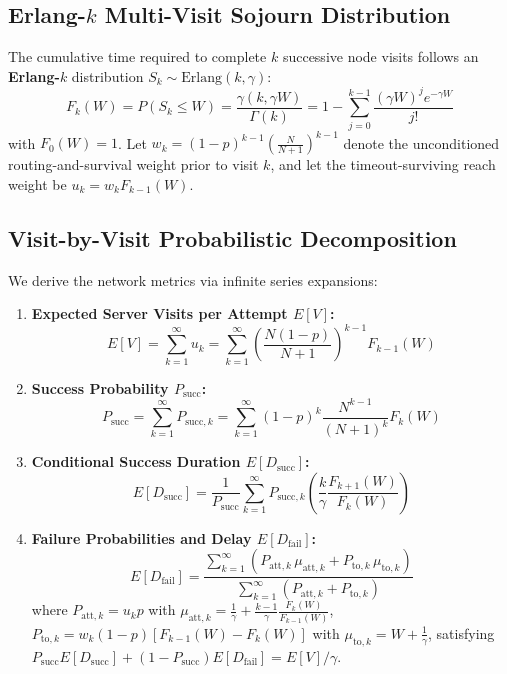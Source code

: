 \documentclass[journal,compsoc]{IEEEtran}
\begin{document}
\subsection{Erlang-$k$ Multi-Visit Sojourn Distribution}
The cumulative time required to complete $k$ successive node visits follows an \textbf{Erlang-$k$} distribution $S_k \sim \text{Erlang}(k, \gamma)$:
\begin{equation}
F_k(W) = P(S_k \le W) = \frac{\gamma(k, \gamma W)}{\Gamma(k)} = 1 - \sum_{j=0}^{k-1} \frac{(\gamma W)^j e^{-\gamma W}}{j!}
\end{equation}
with $F_0(W) = 1$. Let $w_k = (1 - p)^{k-1} \left(\frac{N}{N+1}\right)^{k-1}$ denote the unconditioned routing-and-survival weight prior to visit $k$, and let the timeout-surviving reach weight be $u_k = w_k F_{k-1}(W)$.

\subsection{Visit-by-Visit Probabilistic Decomposition}
We derive the network metrics via infinite series expansions:
\begin{enumerate}
    \item \textbf{Expected Server Visits per Attempt $E[V]$:}
    \begin{equation}
    E[V] = \sum_{k=1}^\infty u_k = \sum_{k=1}^\infty \left(\frac{N(1-p)}{N+1}\right)^{k-1} F_{k-1}(W)
    \end{equation}
    \item \textbf{Success Probability $P_{\text{succ}}$:}
    \begin{equation}
    P_{\text{succ}} = \sum_{k=1}^\infty P_{\text{succ}, k} = \sum_{k=1}^\infty (1 - p)^k \frac{N^{k-1}}{(N+1)^k} F_k(W)
    \end{equation}
    \item \textbf{Conditional Success Duration $E[D_{\text{succ}}]$:}
    \begin{equation}
    E[D_{\text{succ}}] = \frac{1}{P_{\text{succ}}} \sum_{k=1}^\infty P_{\text{succ}, k} \left(\frac{k}{\gamma} \frac{F_{k+1}(W)}{F_k(W)}\right)
    \end{equation}
    \item \textbf{Failure Probabilities and Delay $E[D_{\text{fail}}]$:}
    \begin{equation}
    E[D_{\text{fail}}] = \frac{\sum_{k=1}^\infty \left( P_{\text{att}, k}\,\mu_{\text{att}, k} + P_{\text{to}, k}\,\mu_{\text{to}, k} \right)}{\sum_{k=1}^\infty (P_{\text{att}, k} + P_{\text{to}, k})}
    \end{equation}
    where $P_{\text{att}, k} = u_k p$ with $\mu_{\text{att}, k} = \frac{1}{\gamma} + \frac{k-1}{\gamma}\frac{F_k(W)}{F_{k-1}(W)}$, $P_{\text{to}, k} = w_k (1 - p) [F_{k-1}(W) - F_k(W)]$ with $\mu_{\text{to}, k} = W + \frac{1}{\gamma}$, satisfying $P_{\text{succ}}E[D_{\text{succ}}] + (1-P_{\text{succ}})E[D_{\text{fail}}] = E[V]/\gamma$.
\end{enumerate}
\end{document}
